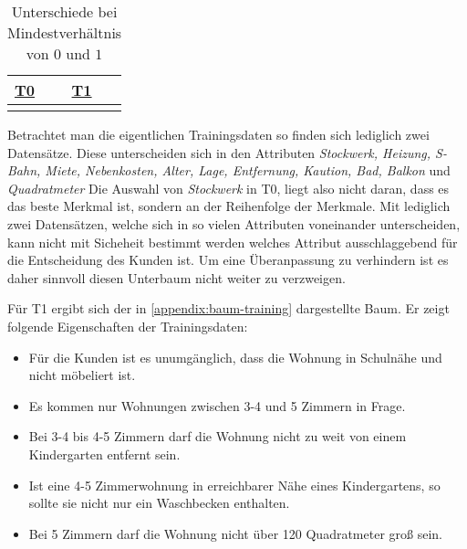 \useunder{\uline}{\ul}{}
\begin{table}[h]
    \begin{center}
        \begin{tabular}{|p{6cm}|p{6cm}|}
        \hline
            {\ul \textbf{T0}}   & {\ul \textbf{T1}} \\
            \hline
            {}
            &
            {}
            \\
            \hline
        \end{tabular}
        \caption{Unterschiede bei Mindestverhältnis von $0$ und $1$}
        \label{tab:diff}
    \end{center}
\end{table}

Betrachtet man die eigentlichen Trainingsdaten so finden sich lediglich zwei Datensätze.
Diese unterscheiden sich in den Attributen \emph{Stockwerk, Heizung, S-Bahn, Miete, Nebenkosten, Alter, Lage, Entfernung, Kaution, Bad, Balkon} und \emph{Quadratmeter}
Die Auswahl von \emph{Stockwerk} in T0, liegt also nicht daran,
dass es das beste Merkmal ist, sondern an der Reihenfolge der Merkmale.
Mit lediglich zwei Datensätzen, welche sich in so vielen Attributen voneinander unterscheiden,
kann nicht mit Sicheheit bestimmt werden welches Attribut ausschlaggebend für die Entscheidung des Kunden ist.
Um eine Überanpassung zu verhindern ist es daher sinnvoll diesen Unterbaum nicht weiter zu verzweigen.

Für T1 ergibt sich der in \autoref{appendix:baum-training} dargestellte Baum.
Er zeigt folgende Eigenschaften der Trainingsdaten:
\begin{itemize}
    \item Für die Kunden ist es unumgänglich, dass die Wohnung in Schulnähe und nicht möbeliert ist.
    \item Es kommen nur Wohnungen zwischen 3-4 und 5 Zimmern in Frage.
    \item Bei 3-4 bis 4-5 Zimmern darf die Wohnung nicht zu weit von einem Kindergarten entfernt sein.
    \item Ist eine 4-5 Zimmerwohnung in erreichbarer Nähe eines Kindergartens, so sollte sie nicht nur ein Waschbecken enthalten.
    \item Bei 5 Zimmern darf die Wohnung nicht über 120 Quadratmeter groß sein.
\end{itemize}

